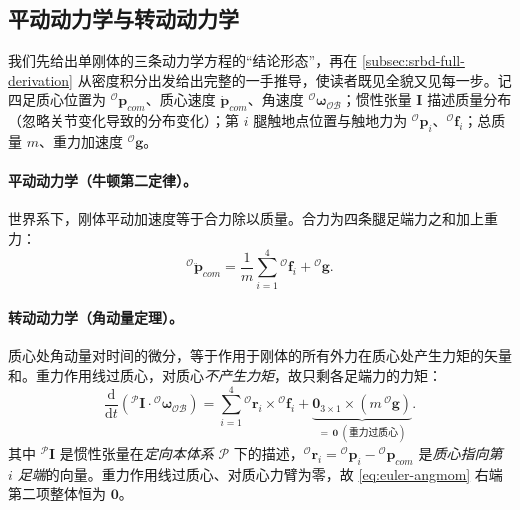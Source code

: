 \subsection{平动动力学与转动动力学}
\label{subsec:dynamics-three}

我们先给出单刚体的三条动力学方程的“结论形态”，再在 \cref{subsec:srbd-full-derivation} 从密度积分出发给出完整的一手推导，使读者既见全貌又见每一步。记四足质心位置为 ${}^{\mathcal{O}}\boldsymbol{p}_{com}$、质心速度 $\dot{\boldsymbol{p}}_{com}$、角速度 ${}^{\mathcal{O}}\boldsymbol{\omega}_{\mathcal{OB}}$；惯性张量 $\mathbf{I}$ 描述质量分布（忽略关节变化导致的分布变化）；第 $i$ 腿触地点位置与触地力为 ${}^{\mathcal{O}}\boldsymbol{p}_i$、${}^{\mathcal{O}}\boldsymbol{f}_i$；总质量 $m$、重力加速度 ${}^{\mathcal{O}}\boldsymbol{g}$。

\paragraph{ 平动动力学（牛顿第二定律）。}
世界系下，刚体平动加速度等于合力除以质量。合力为四条腿足端力之和加上重力\cite{dicarlo2018cheetah}：
\begin{equation}
  {}^{\mathcal{O}}\ddot{\boldsymbol{p}}_{com}=\frac{1}{m}\sum_{i=1}^{4}{}^{\mathcal{O}}\boldsymbol{f}_i+{}^{\mathcal{O}}\boldsymbol{g}.
  \label{eq:newton}
\end{equation}

\paragraph{ 转动动力学（角动量定理）。}
质心处角动量对时间的微分，等于作用于刚体的所有外力在质心处产生力矩的矢量和。重力作用线过质心，对质心\emph{不产生力矩}，故只剩各足端力的力矩\cite{dicarlo2018cheetah}：
\begin{equation}
  \frac{\mathrm{d}}{\mathrm{d}t}\!\left({}^{\mathcal{P}}\mathbf{I}\cdot{}^{\mathcal{O}}\boldsymbol{\omega}_{\mathcal{OB}}\right)
  =\sum_{i=1}^{4}{}^{\mathcal{O}}\boldsymbol{r}_i\times{}^{\mathcal{O}}\boldsymbol{f}_i
  +\underbrace{\mathbf{0}_{3\times1}\times(m\,{}^{\mathcal{O}}\boldsymbol{g})}_{=\,\mathbf{0}\ (\text{重力过质心})}.
  \label{eq:euler-angmom}
\end{equation}
其中 ${}^{\mathcal{P}}\mathbf{I}$ 是惯性张量在\emph{定向本体系} $\mathcal{P}$ 下的描述，${}^{\mathcal{O}}\boldsymbol{r}_i={}^{\mathcal{O}}\boldsymbol{p}_i-{}^{\mathcal{O}}\boldsymbol{p}_{com}$ 是\emph{质心指向第 $i$ 足端}的向量。重力作用线过质心、对质心力臂为零，故 \cref{eq:euler-angmom} 右端第二项整体恒为 $\mathbf{0}$。

